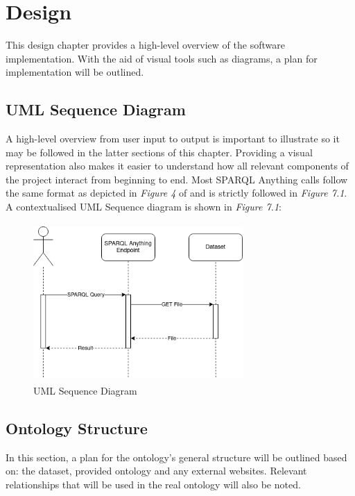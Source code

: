 \chapter{Design}
This design chapter provides a high-level overview of the software implementation. With the aid of visual tools such as diagrams, a plan for implementation will be outlined. 

\section{UML Sequence Diagram}
\hspace{0.5cm} A high-level overview from user input to output is important to illustrate so it may be followed in the latter sections of this chapter. Providing a visual representation also makes it easier to understand how all relevant components of the project interact from beginning to end. Most SPARQL Anything calls follow the same format as depicted in \textit{Figure 4} of \cite{asprino2023knowledge} and is strictly followed in \textit{Figure 7.1}. A contextualised UML Sequence diagram is shown in \textit{Figure 7.1}: 

\begin{figure}[H]
\begin{center}
    \includegraphics[width=8cm, height=6cm]{Images/UMLSequenceDiagram.drawio.png}
\end{center}
\vspace{-0.5cm}
\caption{UML Sequence Diagram}
\end{figure}
\vspace{-0.7cm}

\section{Ontology Structure}
\hspace{0.5cm} In this section, a plan for the ontology's general structure will be outlined based on: the dataset, provided ontology and any external websites. Relevant relationships that will be used in the real ontology will also be noted. 

